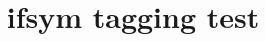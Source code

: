 \documentclass{article}
\title{ifsym tagging test}
\begin{document}
\Telephone

\Fire

\VarMountain

\SquareShadowB

\SmallRightDiamond

\StopWatchEnd

\Lightning

\SnowCloud
\end{document}
